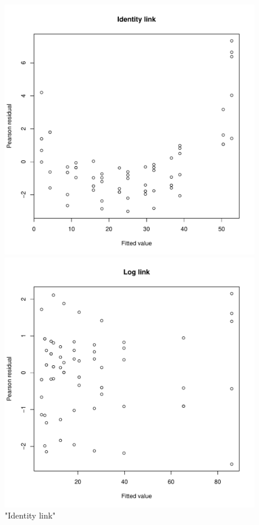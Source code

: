 \documentclass[]{article}
\begin{document}
\begin{enumerate}
{\begin{figure}
	\centering
	\includegraphics[width = \textwidth]{pic/HW2_4/p_res_ide}
	\caption{"Identity link"}
	\label{P_res_ide}
	\endminipage\hfill
	\includegraphics[width = \textwidth]{pic/HW2_4/p_res_log}

\end{figure}}
\end{enumerate}
\end{document}
